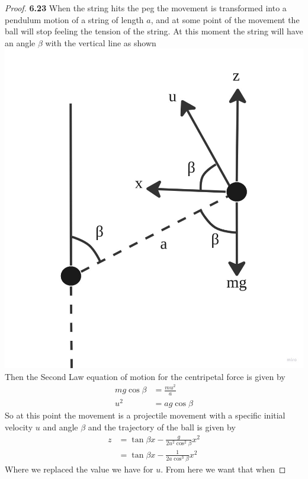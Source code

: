 \documentclass[11pt]{article}
\theoremstyle{definition}
\begin{document}
\cleardoublepage
    \begin{proof}{\textbf{6.23}}
        When the string hits the peg the movement is transformed into a pendulum motion
        of a string of length $a$, and at some point of the movement the ball will stop
        feeling the tension of the string. At this moment the string will have an angle
        $\beta$ with the vertical line as shown
        \includegraphics[width=\textwidth]{"6.23_graph.jpg"}
        Then the Second Law equation of motion for the centripetal force is given by
        \begin{align*}
            mg\cos\beta &= \frac{mu^2}{a}\\ 
            u^2 &= ag\cos\beta
        \end{align*}
        So at this point the movement is a projectile movement with a specific initial
        velocity $u$ and angle $\beta$ and the trajectory of the ball is given by
        \begin{align*}
            z &= \tan{\beta}x - \frac{g}{2u^2\cos^2\beta}x^2\\
              &= \tan{\beta}x - \frac{1}{2a\cos^3\beta}x^2
        \end{align*}
        Where we replaced the value we have for $u$. From here we want that when

\end{proof}
\end{document}
